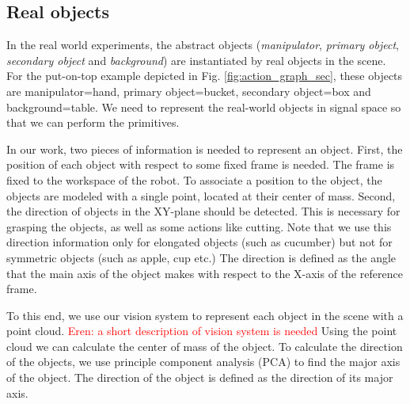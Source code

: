 \subsection{Real objects}
In the real world experiments, the abstract objects (\textit{manipulator}, \textit{primary object}, \textit{secondary object} and \textit{background})
are instantiated by real objects in the scene.
For the put-on-top example depicted in Fig. \ref{fig:action_graph_sec},
these objects are manipulator=hand, primary object=bucket, secondary object=box and background=table.
We need to represent the real-world objects in signal space so that we can perform the primitives.

In our work, two pieces of information is needed to represent an object.
First, the position of each object with respect to some fixed frame is needed.
The frame is fixed to the workspace of the robot.
To associate a position to the object, the objects are modeled with a single point, located at their center of mass.
Second, the direction of objects in the XY-plane should be detected.
This is necessary for grasping the objects, as well as some actions like cutting.
Note that we use this direction information only for elongated objects (such as cucumber) but not for symmetric objects (such as apple, cup etc.)
The direction is defined as the angle that the main axis of the object makes with respect to the X-axis of the reference frame.

To this end, we use our vision system to represent each object in the scene with a point cloud.
\textcolor{red}{Eren: a short description of vision system is needed}
Using the point cloud we can calculate the center of mass of the object.
To calculate the direction of the objects, we use principle component analysis (PCA) to find the major axis of the object.
The direction of the object is defined as the direction of its major axis.

